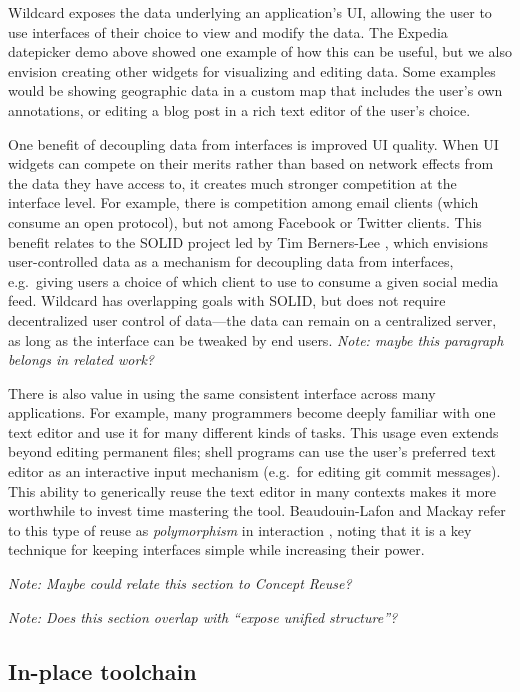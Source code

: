 \documentclass[english,submission]{programming}
\begin{document}
Wildcard exposes the data underlying an application's UI, allowing the
user to use interfaces of their choice to view and modify the data. The
Expedia datepicker demo above showed one example of how this can be
useful, but we also envision creating other widgets for visualizing and
editing data. Some examples would be showing geographic data in a custom
map that includes the user's own annotations, or editing a blog post in
a rich text editor of the user's choice.

One benefit of decoupling data from interfaces is improved UI quality.
When UI widgets can compete on their merits rather than based on network
effects from the data they have access to, it creates much stronger
competition at the interface level. For example, there is competition
among email clients (which consume an open protocol), but not among
Facebook or Twitter clients. This benefit relates to the SOLID project
led by Tim Berners-Lee \autocite{berners-lee2018}, which envisions
user-controlled data as a mechanism for decoupling data from interfaces,
e.g.~giving users a choice of which client to use to consume a given
social media feed. Wildcard has overlapping goals with SOLID, but does
not require decentralized user control of data---the data can remain on
a centralized server, as long as the interface can be tweaked by end
users. \emph{Note: maybe this paragraph belongs in related work?}

There is also value in using the same consistent interface across many
applications. For example, many programmers become deeply familiar with
one text editor and use it for many different kinds of tasks. This usage
even extends beyond editing permanent files; shell programs can use the
user's preferred text editor as an interactive input mechanism (e.g.~for
editing git commit messages). This ability to generically reuse the text
editor in many contexts makes it more worthwhile to invest time
mastering the tool. Beaudouin-Lafon and Mackay refer to this type of
reuse as \emph{polymorphism} in interaction
\autocite{beaudouin-lafon2000}, noting that it is a key technique for
keeping interfaces simple while increasing their power.

\emph{Note: Maybe could relate this section to Concept Reuse?}

\emph{Note: Does this section overlap with ``expose unified
structure''?}

\hypertarget{in-place-toolchain}{%
\subsection{In-place toolchain}\label{in-place-toolchain}}
\end{document}

